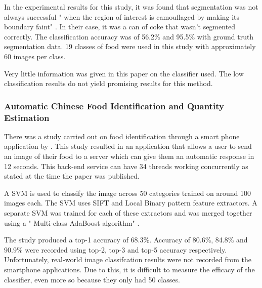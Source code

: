 In the experimental results for this study, it was found that segmentation was not always successful " when the region of interest is camouflaged by making its boundary faint" \parencite{zhu2011segmentation}. In their case, it was a can of coke that wasn't segmented correctly.
The classification accuracy was of 56.2\% and 95.5\% with ground truth segmentation data.
19 classes of food were used in this study with approximately 60 images per class.

Very little information was given in this paper on the classifier used.
The low classification results do not yield promising results for this method.



\subsubsection*{Automatic Chinese Food Identification and Quantity Estimation}
There was a study carried out on food identification through a smart phone application by \parencite{chen2012automatic}.
This study resulted in an application that allows a user to send an image of their food to a server which can give them an automatic response in 12 seconds.
This back-end service can have 34 threads working concurrently as stated at the time the paper was published.

A SVM is used to classify the image across 50 categories trained on around 100 images each.
The SVM uses SIFT and Local Binary pattern feature extractors.
A separate SVM was trained for each of these extractors and was merged together using a " Multi-class AdaBoost algorithm" \parencite{chen2012automatic}.

The study produced a top-1 accuracy  of 68.3\%. Accuracy of 80.6\%, 84.8\% and 90.9\% were recorded using top-2, top-3 and top-5 accuracy respectively.
Unfortunately, real-world image classifcation results were not recorded from the smartphone applications.
Due to this, it is difficult to measure the efficacy of the classifier, even more so because they only had 50 classes.  

